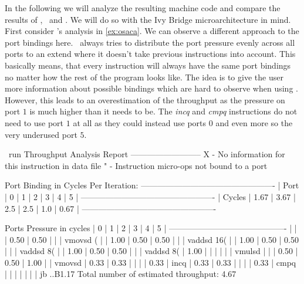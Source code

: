In the following we will analyze the resulting machine code and compare the results of \iaca, \osaca\ and \suaca. We will do so with the Ivy Bridge microarchitecture in mind. First consider \osaca's analysis in \autoref{ex:osaca}. We can observe a different approach to the port bindings here. \osaca\ always tries to distribute the port pressure evenly across all ports to an extend where it doesn't take previous instructions into account. This basically means, that every instruction will always have the same port bindings no matter how the rest of the program looks like. The idea is to give the user more information about possible bindings which are hard to observe when using \iaca. However, this leads to an overestimation of the throughput as the pressure on port $1$ is much higher than it needs to be. The \emph{incq} and \emph{cmpq} instructions do not need to use port $1$ at all as they could instead use ports $0$ and even more so the very underused port $5$. 


\begin{LabeledExample}{\osaca\ run}{\label{ex:osaca}}
    Throughput Analysis Report
    --------------------------
    X - No information for this instruction in data file
    " - Instruction micro-ops not bound to a port
    
    Port Binding in Cycles Per Iteration:
    -------------------------------------------------
    | Port   |   0  |   1  |  2  |  3  |  4  |   5  |
    -------------------------------------------------
    | Cycles | 1.67 | 3.67 | 2.5 | 2.5 | 1.0 | 0.67 |
    -------------------------------------------------
    
    Ports Pressure in cycles
    |   0  |   1  |   2  |   3  |   4  |   5  |
    -------------------------------------------
    |      |      | 0.50 | 0.50 |      |      | vmovsd  (%
    |      | 1.00 | 0.50 | 0.50 |      |      | vaddsd  16(%
    |      | 1.00 | 0.50 | 0.50 |      |      | vaddsd  8(%
    |      | 1.00 | 0.50 | 0.50 |      |      | vaddsd  8(%
    | 1.00 |      |      |      |      |      | vmulsd  %
    |      |      | 0.50 | 0.50 | 1.00 |      | vmovsd  %
    | 0.33 | 0.33 |      |      |      | 0.33 | incq    %
    | 0.33 | 0.33 |      |      |      | 0.33 | cmpq    %
    |      |      |      |      |      |      | jb      ..B1.17
    Total number of estimated throughput: 4.67
\end{LabeledExample}

